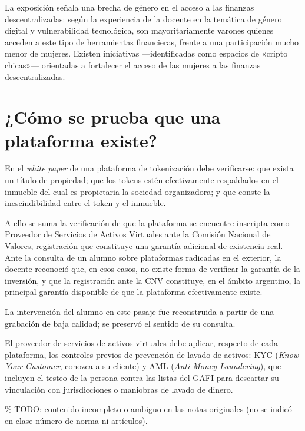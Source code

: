 \documentclass[12pt,oneside]{book}
\begin{document}
La exposición señala una brecha de género en el acceso a las finanzas descentralizadas: según la experiencia de la docente en la temática de género digital y vulnerabilidad tecnológica, son mayoritariamente varones quienes acceden a este tipo de herramientas financieras, frente a una participación mucho menor de mujeres. Existen iniciativas —identificadas como espacios de «cripto chicas»— orientadas a fortalecer el acceso de las mujeres a las finanzas descentralizadas.

\section{¿Cómo se prueba que una plataforma existe?}

\begin{important}
En el \textit{white paper} de una plataforma de tokenización debe verificarse: que exista un título de propiedad; que los tokens estén efectivamente respaldados en el inmueble del cual es propietaria la sociedad organizadora; y que conste la inescindibilidad entre el token y el inmueble.
\end{important}

A ello se suma la verificación de que la plataforma se encuentre inscripta como Proveedor de Servicios de Activos Virtuales ante la Comisión Nacional de Valores, registración que constituye una garantía adicional de existencia real. Ante la consulta de un alumno sobre plataformas radicadas en el exterior, la docente reconoció que, en esos casos, no existe forma de verificar la garantía de la inversión, y que la registración ante la CNV constituye, en el ámbito argentino, la principal garantía disponible de que la plataforma efectivamente existe.

\begin{note}
La intervención del alumno en este pasaje fue reconstruida a partir de una grabación de baja calidad; se preservó el sentido de su consulta.
\end{note}

\begin{important}
El proveedor de servicios de activos virtuales debe aplicar, respecto de cada plataforma, los controles previos de prevención de lavado de activos: KYC (\textit{Know Your Customer}, conozca a su cliente) y AML (\textit{Anti-Money Laundering}), que incluyen el testeo de la persona contra las listas del GAFI para descartar su vinculación con jurisdicciones o maniobras de lavado de dinero.

\% TODO: contenido incompleto o ambiguo en las notas originales (no se indicó en clase número de norma ni artículos).
\end{important}
\end{document}
